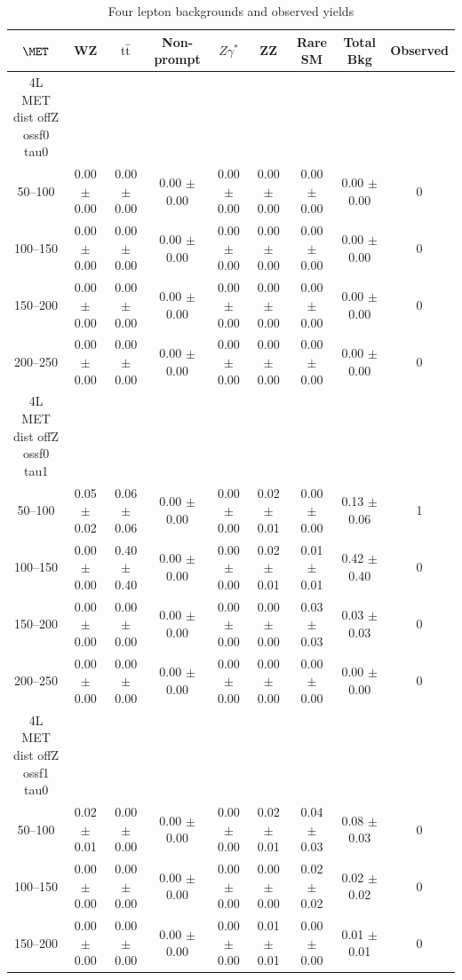 \begin{table}
\tiny
\begin{center}
\caption{\label{tab:fourLeptonResults} Four lepton backgrounds and observed yields}
\begin{tabular}{|c|cccccc|c|c|}
\hline
\hline
$\MET$ & WZ & $\rm t\bar{t}$ &  Non-prompt & $Z\gamma^{*}$ & ZZ & Rare SM & Total Bkg & Observed \\
\hline
\hline
\hline
4L MET dist offZ ossf0 tau0\\
50--100 & 0.00 $\pm$ 0.00 & 0.00 $\pm$ 0.00 & 0.00 $\pm$ 0.00 & 0.00 $\pm$ 0.00 & 0.00 $\pm$ 0.00 & 0.00 $\pm$ 0.00 & 0.00 $\pm$ 0.00 & 0 \\
100--150 & 0.00 $\pm$ 0.00 & 0.00 $\pm$ 0.00 & 0.00 $\pm$ 0.00 & 0.00 $\pm$ 0.00 & 0.00 $\pm$ 0.00 & 0.00 $\pm$ 0.00 & 0.00 $\pm$ 0.00 & 0 \\
150--200 & 0.00 $\pm$ 0.00 & 0.00 $\pm$ 0.00 & 0.00 $\pm$ 0.00 & 0.00 $\pm$ 0.00 & 0.00 $\pm$ 0.00 & 0.00 $\pm$ 0.00 & 0.00 $\pm$ 0.00 & 0 \\
200--250 & 0.00 $\pm$ 0.00 & 0.00 $\pm$ 0.00 & 0.00 $\pm$ 0.00 & 0.00 $\pm$ 0.00 & 0.00 $\pm$ 0.00 & 0.00 $\pm$ 0.00 & 0.00 $\pm$ 0.00 & 0 \\
\hline
4L MET dist offZ ossf0 tau1\\
50--100 & 0.05 $\pm$ 0.02 & 0.06 $\pm$ 0.06 & 0.00 $\pm$ 0.00 & 0.00 $\pm$ 0.00 & 0.02 $\pm$ 0.01 & 0.00 $\pm$ 0.00 & 0.13 $\pm$ 0.06 & 1 \\
100--150 & 0.00 $\pm$ 0.00 & 0.40 $\pm$ 0.40 & 0.00 $\pm$ 0.00 & 0.00 $\pm$ 0.00 & 0.02 $\pm$ 0.01 & 0.01 $\pm$ 0.01 & 0.42 $\pm$ 0.40 & 0 \\
150--200 & 0.00 $\pm$ 0.00 & 0.00 $\pm$ 0.00 & 0.00 $\pm$ 0.00 & 0.00 $\pm$ 0.00 & 0.00 $\pm$ 0.00 & 0.03 $\pm$ 0.03 & 0.03 $\pm$ 0.03 & 0 \\
200--250 & 0.00 $\pm$ 0.00 & 0.00 $\pm$ 0.00 & 0.00 $\pm$ 0.00 & 0.00 $\pm$ 0.00 & 0.00 $\pm$ 0.00 & 0.00 $\pm$ 0.00 & 0.00 $\pm$ 0.00 & 0 \\
\hline
4L MET dist offZ ossf1 tau0\\
50--100 & 0.02 $\pm$ 0.01 & 0.00 $\pm$ 0.00 & 0.00 $\pm$ 0.00 & 0.00 $\pm$ 0.00 & 0.02 $\pm$ 0.01 & 0.04 $\pm$ 0.03 & 0.08 $\pm$ 0.03 & 0 \\
100--150 & 0.00 $\pm$ 0.00 & 0.00 $\pm$ 0.00 & 0.00 $\pm$ 0.00 & 0.00 $\pm$ 0.00 & 0.00 $\pm$ 0.00 & 0.02 $\pm$ 0.02 & 0.02 $\pm$ 0.02 & 0 \\
150--200 & 0.00 $\pm$ 0.00 & 0.00 $\pm$ 0.00 & 0.00 $\pm$ 0.00 & 0.00 $\pm$ 0.00 & 0.01 $\pm$ 0.01 & 0.00 $\pm$ 0.00 & 0.01 $\pm$ 0.01 & 0 \\

\end{tabular}
\end{center}
\end{table}
